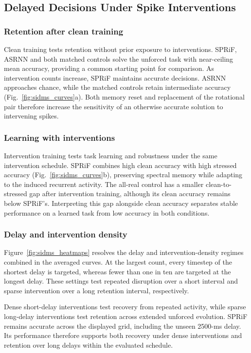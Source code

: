 \documentclass[letterpaper,journal]{IEEEtran}
\begin{document}
\subsection{Delayed Decisions Under Spike Interventions}
\label{sec:sidms_results}

\subsubsection{Retention after clean training}
Clean training tests retention without prior exposure to interventions. SPRiF, ASRNN and both matched controls solve the unforced task with near-ceiling mean accuracy, providing a common starting point for comparison. As intervention counts increase, SPRiF maintains accurate decisions. ASRNN approaches chance, while the matched controls retain intermediate accuracy (Fig.~\ref{fig:sidms_curves}a). Both memory reset and replacement of the rotational pair therefore increase the sensitivity of an otherwise accurate solution to intervening spikes.

\subsubsection{Learning with interventions}
Intervention training tests task learning and robustness under the same intervention schedule. SPRiF combines high clean accuracy with high stressed accuracy (Fig.~\ref{fig:sidms_curves}b), preserving spectral memory while adapting to the induced recurrent activity. The all-real control has a smaller clean-to-stressed gap after intervention training, although its clean accuracy remains below SPRiF's. Interpreting this gap alongside clean accuracy separates stable performance on a learned task from low accuracy in both conditions.

\subsubsection{Delay and intervention density}
Figure~\ref{fig:sidms_heatmaps} resolves the delay and intervention-density regimes combined in the averaged curves. At the largest count, every timestep of the shortest delay is targeted, whereas fewer than one in ten are targeted at the longest delay. These settings test repeated disruption over a short interval and sparse intervention over a long retention interval, respectively.

Dense short-delay interventions test recovery from repeated activity, while sparse long-delay interventions test retention across extended unforced evolution. SPRiF remains accurate across the displayed grid, including the unseen 2500-ms delay. Its performance therefore supports both recovery under dense interventions and retention over long delays within the evaluated schedule.
\end{document}
